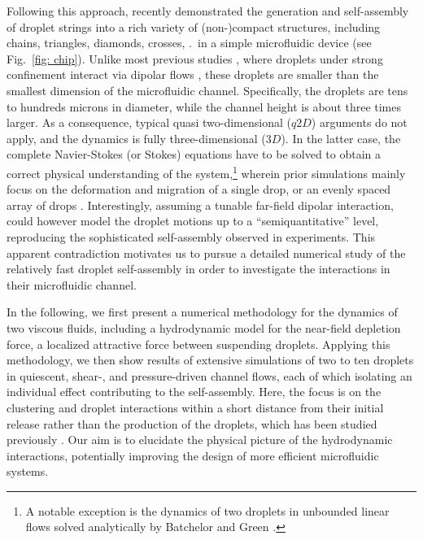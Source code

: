 Following this approach,   \cite{Shen_2016AS} recently demonstrated the generation and self-assembly of droplet strings into a rich variety of (non-)compact structures, including chains, triangles, diamonds, crosses, \etc .\ in a simple microfluidic device (see Fig.\ \ref{fig: chip}). Unlike most previous studies \cite{Cui2004,Beatus2006,Janssen2012,Uspal2013,Desreumaux,zhu_gallaire_2016}, where droplets under strong confinement interact via dipolar flows \cite{q2d_Beatus,Diamant}, these droplets are smaller than the smallest dimension of the microfluidic channel. Specifically, the droplets are tens to hundreds microns in diameter, while the channel height is about three times larger. As a consequence, typical quasi two-dimensional ($q2D$) arguments do not apply, and the dynamics is fully three-dimensional ($3D$). In the latter case, the complete Navier-Stokes (or Stokes) equations have to be solved to obtain a correct physical understanding of the system,\footnote{A notable exception is the dynamics of two droplets in unbounded linear flows solved analytically by Batchelor and Green \cite{batchelor_green_1972}.} wherein prior simulations mainly focus on the deformation and migration of a single drop, or an evenly spaced array of drops \cite{coulliette_pozrikidis_1998,Griggs2007,Janssen_Anderson_2007}. Interestingly, assuming a tunable far-field dipolar interaction,   \cite{Shen_2016AS} could however model the droplet motions up to a ``semiquantitative'' level, reproducing the sophisticated self-assembly observed in experiments. This apparent contradiction motivates us to pursue a detailed numerical study of the relatively fast droplet self-assembly in order to investigate the interactions in their microfluidic channel.

In the following, we first present a numerical methodology for the dynamics of two viscous fluids, including a hydrodynamic model for the near-field depletion force, a localized attractive force between suspending droplets. Applying this methodology, we then show results of extensive simulations of two to ten droplets in quiescent, shear-, and pressure-driven channel flows, each of which isolating an individual effect contributing to the self-assembly. Here, the focus is on the clustering and droplet interactions within a short distance from their initial release rather than the production of the droplets, which has been studied previously \cite{step-emuls}. Our aim is to elucidate the physical picture of the hydrodynamic interactions, potentially improving the design of more efficient microfluidic systems.

